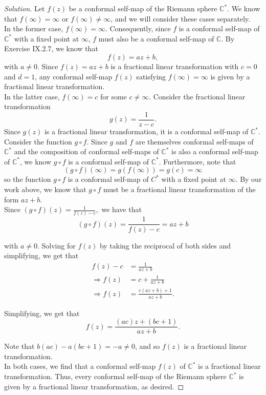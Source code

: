 \documentclass[11pt]{article}
\newcommand{\C}{\mathbb{C}}
\newenvironment{solution}
  {\renewcommand\qedsymbol{$\blacksquare$}\begin{proof}[Solution]}
  {\end{proof}}
\theoremstyle{definition}
\begin{document}
\begin{solution}
Let $f(z)$ be a conformal self-map of the Riemann sphere $\C^*$. We know that $f(\infty) = \infty$ or $f(\infty) \neq \infty$, and we will consider these cases separately. \\

In the former case, $f(\infty) = \infty$. Consequently, since $f$ is a conformal self-map of $\C^*$ with a fixed point at $\infty$, $f$ must also be a conformal self-map of $\C$. 
By Exercise IX.2.7, we know that \[f(z) = az+b,\] with $a \neq 0$. Since $f(z) = az+b$ is a fractional linear transformation with $c=0$ and $d=1$, any conformal self-map $f(z)$ satisfying $f(\infty) = \infty$ is given by a fractional linear transformation. \\

In the latter case, $f(\infty) = c$ for some $c \neq \infty$. Consider the fractional linear transformation \[ g(z) = \frac{1}{z-c}.\]
Since $g(z)$ is a fractional linear transformation, it is a conformal self-map of $\C^*$. \\

Consider the function $g \circ f$. Since $g$ and $f$ are themselves conformal self-maps of $\C^*$ and the composition of conformal self-maps of $\C^*$ is also a conformal self-map of $\C^*$, we know $g \circ f$ is a conformal self-map of $\C^*$. 
Furthermore, note that \[(g \circ f)(\infty) = g(f(\infty)) = g(c) = \infty\]
so the function $g \circ f$ is a conformal self-map of $C^*$ with a fixed point at $\infty$. By our work above, we know that $g \circ f$ must be a fractional linear transformation of the form $az+b$. \\

Since $(g \circ f)(z) = \frac{1}{f(z) - c},$ we have that
\[ (g \circ f)(z) = \frac{1}{f(z) - c} = az+b\] 

with $a \neq 0$. Solving for $f(z)$ by taking the reciprocal of both sides and simplifying, we get that
\begin{align*} f(z) - c &= \frac{1}{az+b} \\
\Rightarrow f(z) &= c + \frac{1}{az+b} \\
\Rightarrow f(z) &= \frac{c(az+b)+1}{az+b}. \end{align*}

Simplifying, we get that
\[ f(z) = \frac{(ac)z + (bc+1)}{az+b}.\]

Note that $b(ac) - a(bc+1) = - a \neq 0$, and so $f(z)$ is a fractional linear transformation. \\

In both cases, we find that a conformal self-map $f(z)$ of $\C^*$ is a fractional linear transformation. Thus, every conformal self-map of the Riemann sphere $\C^*$ is given by a fractional linear transformation, as desired. \end{solution}    
\end{document}
